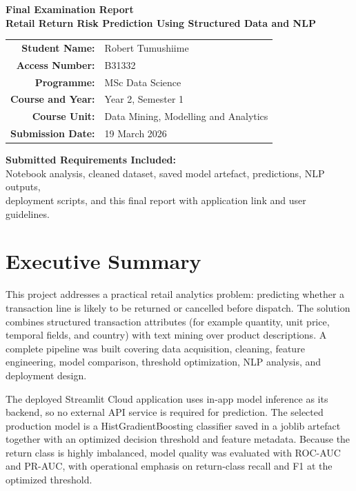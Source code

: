 \documentclass[11pt,a4paper]{article}
\newcommand{\studentname}{Robert Tumushiime}
\newcommand{\accessno}{B31332}
\newcommand{\programme}{MSc Data Science}
\newcommand{\courseyear}{Year 2, Semester 1}
\newcommand{\courseunit}{Data Mining, Modelling and Analytics}
\newcommand{\submissiondate}{19 March 2026}
\begin{document}
\begin{titlepage}
    \centering
    {\Large \textbf{Final Examination Report}}\\[1.2em]
    {\large \textbf{Retail Return Risk Prediction Using Structured Data and NLP}}\\[2em]

    \begin{tabular}{rl}
    \textbf{Student Name:} & \studentname \\
    \textbf{Access Number:} & \accessno \\
    \textbf{Programme:} & \programme \\
    \textbf{Course and Year:} & \courseyear \\
    \textbf{Course Unit:} & \courseunit \\
    \textbf{Submission Date:} & \submissiondate \\
    \end{tabular}

    \vfill

    \textbf{Submitted Requirements Included:}\\
    Notebook analysis, cleaned dataset, saved model artefact, predictions, NLP outputs,\\
    deployment scripts, and this final report with application link and user guidelines.

    \vfill
\end{titlepage}

\section{Executive Summary}
This project addresses a practical retail analytics problem: predicting whether a transaction line is likely to be returned or cancelled before dispatch. The solution combines structured transaction attributes (for example quantity, unit price, temporal fields, and country) with text mining over product descriptions. A complete pipeline was built covering data acquisition, cleaning, feature engineering, model comparison, threshold optimization, NLP analysis, and deployment design.

The deployed Streamlit Cloud application uses in-app model inference as its backend, so no external API service is required for prediction. The selected production model is a HistGradientBoosting classifier saved in a joblib artefact together with an optimized decision threshold and feature metadata. Because the return class is highly imbalanced, model quality was evaluated with ROC-AUC and PR-AUC, with operational emphasis on return-class recall and F1 at the optimized threshold.
\end{document}

